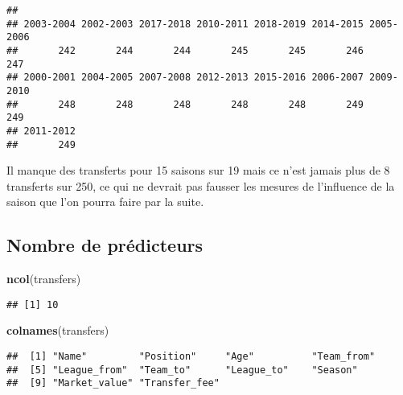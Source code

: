 \documentclass[]{article}
\newenvironment{Shaded}{\begin{snugshade}}{\end{snugshade}}
\newcommand{\DecValTok}[1]{\textcolor[rgb]{0.00,0.00,0.81}{#1}}
\newcommand{\KeywordTok}[1]{\textcolor[rgb]{0.13,0.29,0.53}{\textbf{#1}}}
\newcommand{\NormalTok}[1]{#1}
\newcommand{\OperatorTok}[1]{\textcolor[rgb]{0.81,0.36,0.00}{\textbf{#1}}}
\newcommand{\StringTok}[1]{\textcolor[rgb]{0.31,0.60,0.02}{#1}}
\begin{document}
\begin{Shaded}
\end{Shaded}

\begin{verbatim}
## 
## 2003-2004 2002-2003 2017-2018 2010-2011 2018-2019 2014-2015 2005-2006 
##       242       244       244       245       245       246       247 
## 2000-2001 2004-2005 2007-2008 2012-2013 2015-2016 2006-2007 2009-2010 
##       248       248       248       248       248       249       249 
## 2011-2012 
##       249
\end{verbatim}

Il manque des transferts pour 15 saisons sur 19 mais ce n'est jamais
plus de 8 transferts sur 250, ce qui ne devrait pas fausser les mesures
de l'influence de la saison que l'on pourra faire par la suite.

\hypertarget{nombre-de-predicteurs}{%
\subsection{Nombre de prédicteurs}\label{nombre-de-predicteurs}}

\begin{Shaded}
\begin{Highlighting}[]
\KeywordTok{ncol}\NormalTok{(transfers)}
\end{Highlighting}
\end{Shaded}

\begin{verbatim}
## [1] 10
\end{verbatim}

\begin{Shaded}
\begin{Highlighting}[]
\KeywordTok{colnames}\NormalTok{(transfers)}
\end{Highlighting}
\end{Shaded}

\begin{verbatim}
##  [1] "Name"         "Position"     "Age"          "Team_from"   
##  [5] "League_from"  "Team_to"      "League_to"    "Season"      
##  [9] "Market_value" "Transfer_fee"
\end{verbatim}
\end{document}
